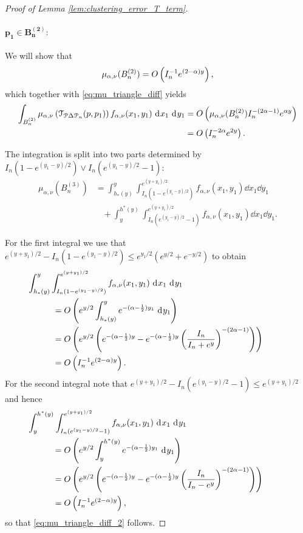 \begin{proof}[Proof of Lemma \ref{lem:clustering_error_T_term}]
\paragraph{$\bm{p_1 \in B_n^{(2)}}:$}

We will show that
\begin{equation}\label{eq:mu_triangle_diff_2}
	\mu_{\alpha, \nu}(B_n^{(2)}) = O\left(I_n^{-1} e^{(2-\alpha)y}\right),
\end{equation}
which together with \eqref{eq:mu_triangle_diff} yields
\begin{align*}
	\int_{B_n^{(2)}} \mu_{\alpha, \nu}\left(\mathcal{T}_{{\mathcal P} \Delta {\mathcal P}_n}(p,p_1)\right) 
		f_{\alpha,\nu}(x_1,y_1)	\operatorname{\, \mathrm{d}\hspace{-1pt}} x_1 \operatorname{\, \mathrm{d}\hspace{-1pt}} y_1
	&= O\left(\mu_{\alpha, \nu}(B_n^{(2)}) I_n^{-(2\alpha - 1)} e^{\alpha y}\right)\\
	&= O\left(I_n^{-2\alpha} e^{2y}\right).
\end{align*}

The integration is split into two parts determined by $I_n\left(1 - e^{(y_1-y)/2}\right) \vee 
	I_n\left(e^{(y_1 - y)/2} - 1\right)$:
\begin{align*}
	\mu_{\alpha, \nu}(B_n^{(3)}) &= \int_{h_\ast(y)}^{y} \int_{I_n(1-e^{(y_1-y)/2})}^{e^{(y + y_1)/2}} 
		f_{\alpha,\nu}(x_1,y_1) \dd x_1 \dd y_1\\
	&\hspace{10pt} + \int_y^{h^\ast(y)} \int_{I_n(e^{(y_1-y)/2}-1)}^{e^{(y + y_1)/2}} 
		f_{\alpha,\nu}(x_1,y_1) \dd x_1 \dd y_1.
\end{align*}

For the first integral we use that $e^{(y + y_1)/2} - I_n(1-e^{(y_1-y)/2}) \le e^{y_1/2}\left(e^{y/2} + e^{-y/2}\right)$ to obtain
\begin{align*}
	&\hspace{-30pt}\int_{h_\ast(y)}^{y} \int_{I_n(1-e^{(y_1-y)/2})}^{e^{(y + y_1)/2}} f_{\alpha,\nu}(x_1,y_1) 
		\dd x_1 \dd y_1\\
	&= \bigO{e^{y/2} \int_{h_\ast(y)}^{y} e^{-(\alpha - \frac{1}{2})y_1} \dd y_1}\\
	&= \bigO{e^{y/2}\left(e^{-(\alpha - \frac{1}{2})y} - e^{-(\alpha - \frac{1}{2})y} 
		\left(\frac{I_n}{I_n + e^y}\right)^{-(2\alpha - 1)}\right)}\\
	&= \bigO{I_n^{-1} e^{(2-\alpha)y}}.
\end{align*}
For the second integral note that $e^{(y + y_1)/2} - I_n(e^{(y_1-y)/2}-1) \le e^{(y + y_1)/2}$ and hence
\begin{align*}
	&\hspace{-30pt}\int_y^{h^\ast(y)} \int_{I_n(e^{(y_1-y)/2}-1)}^{e^{(y + y_1)/2}} f_{\alpha,\nu}(x_1,y_1) 
		\dd x_1 \dd y_1\\
	&= \bigO{e^{y/2} \int_y^{h^\ast(y)} e^{-(\alpha - \frac{1}{2})y_1} \dd y_1}\\
	&= \bigO{e^{y/2} \left(e^{-(\alpha - \frac{1}{2})y} - e^{-(\alpha - \frac{1}{2})y}
		\left(\frac{I_n}{I_n - e^y}\right)^{-(2\alpha - 1)}\right)}\\
	&= \bigO{I_n^{-1} e^{(2-\alpha)y}},
\end{align*}
so that \eqref{eq:mu_triangle_diff_2} follows.


\end{proof}
